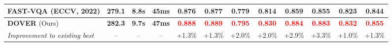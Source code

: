 \documentclass[10pt,twocolumn,letterpaper]{article}
\newcommand{\blue}[1]{\textbf{\textcolor{mblue}{#1}}}
\newcommand{\bred}[1]{\textbf{\textcolor{red}{#1}}}
\newcommand{\green}[1]{\textcolor{mgreen}{#1}}
\begin{document}
\begin{table*}[htbp]
{\begin{tabular}{l:ccc|cc|cc|cc|cc}
{FAST-VQA (ECCV, 2022) } \cite{fastvqa} & \green{\textbf{279.1}} & \green{\textbf{8.8s}} & \green{\textbf{45ms}} & {\blue{0.876}} & {\blue{0.877}}  & {\blue{0.779}} & {\blue{0.814}} & \blue{0.859} & \blue{0.855} & {\blue{0.823}} & {\blue{0.844}}  \\ \hline



{\textbf{DOVER} (Ours)} & \green{\textbf{282.3}} & \green{\textbf{9.7s}} & \green{\textbf{47ms}}  &  {\bred{{0.888}}} & {\bred{{0.889}}}  & {\bred{{0.795}}} & {\bred{{0.830}}} & {\bred{{0.884}}} & {\bred{{0.883}}}& {\bred{{0.832}}} & {\bred{{0.855}}}  \\ \hdashline
\textit{Improvement to existing best} & -- & -- & -- & +1.3\% & +1.3\% & +2.0\% & +2.0\% & +2.9\% & +3.3\% & +1.0\% & +1.3\% \\
\hline
\end{tabular}}
\vspace{-7pt}
\end{table*}

\begin{comment}
\begin{table}
    \centering
    \footnotesize
    \renewcommand\arraystretch{1.2}
    \caption{Results of \textbf{Pairwise User Studies}: the concordance between subjective votes on \textit{\textbf{aesthetic quality}} or \textit{\textbf{technical quality}}, and relative predictions of the pair from either aesthetic or technical branch in DOVER.}
    \vspace{-8pt}
    \resizebox{\linewidth}{!}{\begin{tabular}{l|c|c|c}
        \hline
         Concordance between & \textbf{Aesthetic Predictions} & \textbf{Technical Predictions} & \textbf{MOS Labels} \\ \hline
         - \textbf{\textit{aesthetic quality}} & \textbf{69\%} (\textbf{138}/200) & 31\% (62/200) & 58\% (116/200) \\
         - \textbf{\textit{technical quality}} & 26\% (52/200) & \textbf{74\%} (\textbf{148}/200) & 62.5\% (125/200) \\
         \hline
    \end{tabular}}
    \label{tab:votes}
    \vspace{-14pt}
\end{table}
\end{comment}
\end{document}
